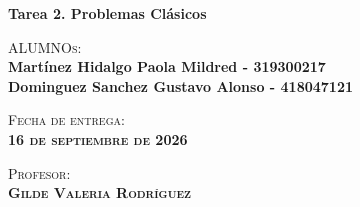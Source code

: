 \begin{titlepage}
\begin{minipage}[c][0.81\textheight][t]{0.75\textwidth}
\begin{center}
            \textbf{\Large Tarea 2. Problemas Clásicos} \\

            \vspace{1cm}
            
            \textsc{\Large{ALUMNOs:}}\\[0.3cm]
            \textbf{Martínez Hidalgo Paola Mildred - 319300217} \\
            \textbf{Dominguez Sanchez Gustavo Alonso - 418047121} \\
            [0.2cm]
                \vspace{1cm}
            
            \textsc{{Fecha de entrega: \\ \textbf{16 de septiembre de 2026}}}\\[0.5cm]        
            \vspace{0.5cm}
            
            \textsc{{Profesor: \\ \textbf{Gilde Valeria Rodríguez}}}\\[0.5cm]  
            
            
            \vspace{0.5cm}
        \end{center}
    \end{minipage}
\end{titlepage}